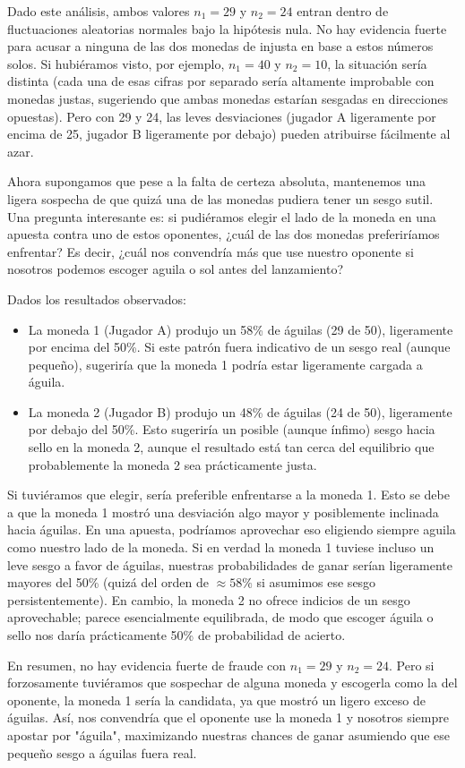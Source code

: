 \documentclass[11pt,letterpaper]{article}
\begin{document}
Dado este análisis, ambos valores $n_1=29$ y $n_2=24$ entran dentro de fluctuaciones aleatorias normales bajo la hipótesis nula. No hay evidencia fuerte para acusar a ninguna de las dos monedas de injusta en base a estos números solos. Si hubiéramos visto, por ejemplo, $n_1=40$ y $n_2=10$, la situación sería distinta (cada una de esas cifras por separado sería altamente improbable con monedas justas, sugeriendo que ambas monedas estarían sesgadas en direcciones opuestas). Pero con 29 y 24, las leves desviaciones (jugador A ligeramente por encima de 25, jugador B ligeramente por debajo) pueden atribuirse fácilmente al azar.

Ahora supongamos que pese a la falta de certeza absoluta, mantenemos una ligera sospecha de que quizá una de las monedas pudiera tener un sesgo sutil. Una pregunta interesante es: si pudiéramos elegir el lado de la moneda en una apuesta contra uno de estos oponentes, ¿cuál de las dos monedas preferiríamos enfrentar?  Es decir, ¿cuál nos convendría más que use nuestro oponente si nosotros podemos escoger aguila o sol antes del lanzamiento?

Dados los resultados observados:

\begin{itemize}
    \item La moneda 1 (Jugador A) produjo un 58\% de águilas (29 de 50), ligeramente por encima del 50\%. Si este patrón fuera indicativo de un sesgo real (aunque pequeño), sugeriría que la moneda 1 podría estar ligeramente cargada a águila.
    \item La moneda 2 (Jugador B) produjo un 48\% de águilas (24 de 50), ligeramente por debajo del 50\%. Esto sugeriría un posible (aunque ínfimo) sesgo hacia sello en la moneda 2, aunque el resultado está tan cerca del equilibrio que probablemente la moneda 2 sea prácticamente justa.
\end{itemize}

Si tuviéramos que elegir, sería preferible enfrentarse a la moneda 1. Esto se debe a que la moneda 1 mostró una desviación algo mayor y posiblemente inclinada hacia águilas. En una apuesta, podríamos aprovechar eso eligiendo siempre aguila como nuestro lado de la moneda. Si en verdad la moneda 1 tuviese incluso un leve sesgo a favor de águilas, nuestras probabilidades de ganar serían ligeramente mayores del 50\% (quizá del orden de $\approx 58\%$ si asumimos ese sesgo persistentemente). En cambio, la moneda 2 no ofrece indicios de un sesgo aprovechable; parece esencialmente equilibrada, de modo que escoger águila o sello nos daría prácticamente 50\% de probabilidad de acierto. 

En resumen, no hay evidencia fuerte de fraude con $n_1=29$ y $n_2=24$. Pero si forzosamente tuviéramos que sospechar de alguna moneda y escogerla como la del oponente, la moneda 1 sería la candidata, ya que mostró un ligero exceso de águilas. Así, nos convendría que el oponente use la moneda 1 y nosotros siempre apostar por "águila", maximizando nuestras chances de ganar asumiendo que ese pequeño sesgo a águilas fuera real.



%
\end{document}
